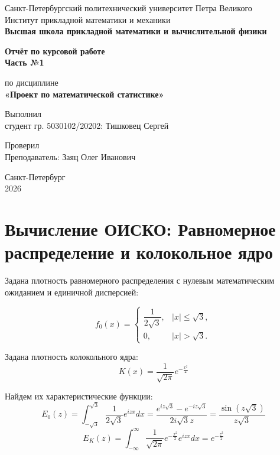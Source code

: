 \documentclass[12pt,a4paper]{article}
\begin{document}
\begin{titlepage}
  \begin{center}
    {Санкт-Петербургский политехнический университет Петра Великого\\
    Институт прикладной математики и механики\\[0.5em]
    \textbf{Высшая школа прикладной математики и вычислительной физики}}
   
    \vfill
   
    {\LARGE\bfseries Отчёт по курсовой работе\\ Часть №1\par}
    \vspace{1em}
    {\Large по дисциплине\\[0.3em] {\bfseries «Проект по математической статистике»}}
   
    \vfill
   
    \begin{flushright}
        Выполнил\\
        студент гр. 5030102/20202: Тишковец Сергей
    \end{flushright}
   
   
    \begin{flushright}
        Проверил\\
        Преподаватель: Заяц Олег Иванович
    \end{flushright}
   
    \vfill
    Санкт-Петербург\\
    2026
  \end{center}
\end{titlepage}
\setcounter{page}{2}
\newpage

\section*{Вычисление ОИСКО: Равномерное распределение и колокольное ядро}

Задана плотность равномерного распределения с нулевым математическим ожиданием и единичной дисперсией:

\[
f_0(x) = 
\begin{cases}
\dfrac{1}{2\sqrt{3}}, & |x| \le \sqrt{3}, \\
0, & |x| > \sqrt{3}.
\end{cases}
\]

Задана плотность колокольного ядра:
$$K(x) = \frac{1}{\sqrt{2\pi}} e^{-\frac{x^2}{2}}$$

Найдем их характеристические функции:
$$E_0(z) = \int_{-\sqrt{3}}^{\sqrt{3}} \frac{1}{2\sqrt{3}} e^{izx} dx = \frac{e^{iz\sqrt{3}} - e^{-iz\sqrt{3}}}{2i\sqrt{3}z} = \frac{\sin(z\sqrt{3})}{z\sqrt{3}}$$
$$E_K(z) = \int_{-\infty}^{\infty} \frac{1}{\sqrt{2\pi}} e^{-\frac{x^2}{2}} e^{izx} dx = e^{-\frac{z^2}{2}}$$
\end{document}
